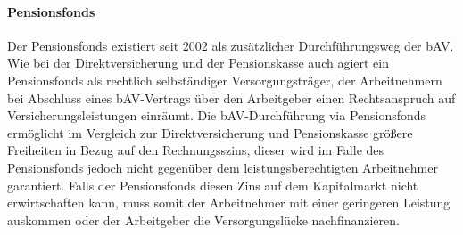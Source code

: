 \paragraph*{Pensionsfonds}

Der Pensionsfonds existiert seit 2002 als zusätzlicher Durchführungsweg der bAV. Wie bei der Direktversicherung und der Pensionskasse auch agiert ein Pensionsfonds als rechtlich selbständiger Versorgungsträger, der Arbeitnehmern bei Abschluss eines bAV-Vertrags über den Arbeitgeber einen Rechtsanspruch auf Versicherungsleistungen einräumt. Die bAV-Durchführung via Pensionsfonds ermöglicht im Vergleich zur Direktversicherung und Pensionskasse größere Freiheiten in Bezug auf den Rechnungsszins, dieser wird im Falle des Pensionsfonds jedoch nicht gegenüber dem leistungsberechtigten Arbeitnehmer garantiert. Falls der Pensionsfonds diesen Zins auf dem Kapitalmarkt nicht erwirtschaften kann, muss somit der Arbeitnehmer mit einer geringeren Leistung auskommen oder der Arbeitgeber die Versorgungslücke nachfinanzieren. 

